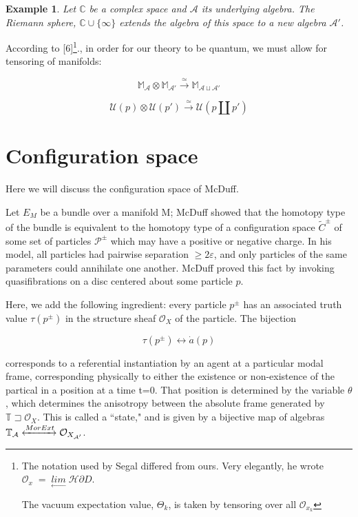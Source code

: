 \documentclass{article}
\newtheorem{eg}{Example}
\begin{document}
		\begin{eg}
			Let $\mathbb{C}$ be a complex space and $\mathcal{A}$ its underlying algebra. The Riemann sphere, $\mathbb{C}\cup\{\infty\}$ extends the algebra of this space to a new algebra $\mathcal{A}'$.
		\end{eg}
	
	According to [6]\footnote{The notation used by Segal differed from ours. Very elegantly, he wrote $\mathcal{O}_x \; = \; \underset{\leftarrow}{lim} \; \mathcal{H}\partial D$. 
		
		The vacuum expectation value, $\Theta_k$, is taken by tensoring over all $\mathcal{O}_{x_k}$}., in order for our theory to be quantum, we must allow for tensoring of manifolds:
	
	\begin{equation}
	\mathbb{M}_\mathcal{A} \otimes \mathbb{M}_{\mathcal{A}'} \xrightarrow{\simeq} \mathbb{M}_{\mathcal{A} \sqcup \mathcal{A}'}
	\end{equation}
	
	\begin{equation}
			\mathcal{U}(p) \otimes \mathcal{U}(p') \xrightarrow{\simeq} \mathcal{U}(p\amalg p')
	\end{equation}
	
	\section{Configuration space}
	Here we will discuss the configuration space of McDuff. 
	
	Let $E_M$ be a bundle over a manifold M; McDuff showed that the homotopy type of the bundle is equivalent to the homotopy type of a configuration space $\tilde{C}^\pm$ of some set of particles $\mathcal{P}^\pm$ which may have a positive or negative charge. In his model, all particles had pairwise separation $\geq2\varepsilon$, and only particles of the same parameters could annihilate one another. McDuff proved this fact by invoking quasifibrations on a disc centered about some particle $p$.
	
Here, we add the following ingredient: every particle $p^\pm$ has an associated truth value $\tau(p^\pm)$ in the structure sheaf $\mathcal{O}_X$ of the particle. The bijection 

$$\tau(p^\pm) \leftrightarrow \dot{a}(p)$$

corresponds to a referential instantiation by an agent at a particular modal frame, corresponding physically to either the existence or non-existence of the partical in a position at a time t=0. That position is determined by the variable $\theta$, which determines the anisotropy between the absolute frame generated by $\mathbb{T}\sqsupset\mathcal{O}_X$. This is called a ``state," and is given by a bijective map of algebras $\mathbb{T}_\mathcal{A} \xleftrightarrow{MorExt} \mathcal{O}_{X_\mathcal{A'}}$.
\end{document}
